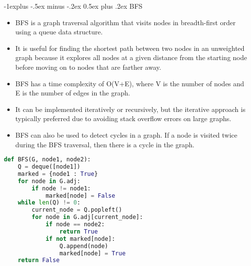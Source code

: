 \documentclass[letterpaper, 8pt]{extarticle}
\makeatletter
\renewcommand{\subsection}{\@startsection{subsection}{2}{0mm}%
                                {-1explus -.5ex minus -.2ex}%
                                {0.5ex plus .2ex}%
                                {\normalfont\small\bfseries}}
\makeatother
\begin{document}
\begin{multicols*}{5}
\subsection{BFS}
\begin{itemize}
\item BFS is a graph traversal algorithm that visits nodes in breadth-first order using a queue data structure.
\item It is useful for finding the shortest path between two nodes in an unweighted graph because it explores all nodes at a given distance from the starting node before moving on to nodes that are farther away.
\item BFS has a time complexity of O(V+E), where V is the number of nodes and E is the number of edges in the graph.
\item It can be implemented iteratively or recursively, but the iterative approach is typically preferred due to avoiding stack overflow errors on large graphs.
\item BFS can also be used to detect cycles in a graph. If a node is visited twice during the BFS traversal, then there is a cycle in the graph.
\end{itemize}

\begin{lstlisting}[language=Python, breaklines=true, postbreak=\mbox{\textcolor{red}{$\hookrightarrow$}\space}]
def BFS(G, node1, node2):
    Q = deque([node1])
    marked = {node1 : True}
    for node in G.adj:
        if node != node1:
            marked[node] = False
    while len(Q) != 0:
        current_node = Q.popleft()
        for node in G.adj[current_node]:
            if node == node2:
                return True
            if not marked[node]:
                Q.append(node)
                marked[node] = True
    return False
\end{lstlisting}


\end{multicols*}
\end{document}
